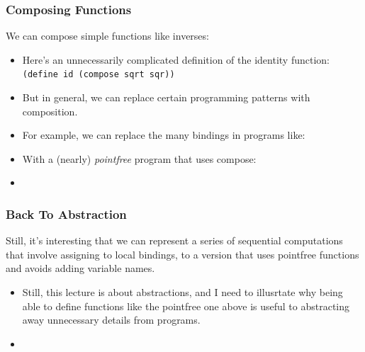 \documentclass{beamer}
\begin{document}





\begin{frame}
  \frametitle{Composing Functions}
  We can compose simple functions like inverses:
  \begin{itemize}
  \item<2-> Here's an unnecessarily complicated definition of the identity function: \texttt{(define id (compose sqrt sqr))}
  \item<3-> But in general, we can replace certain programming patterns with
    composition.
  \item<4-> For example, we can replace the many bindings in programs like:
    \bindings
  \item<5-> With a (nearly) \emph{pointfree} program that uses compose:
  \item<6-> \pointfree  
  \end{itemize}
\end{frame}

\begin{frame}
  \frametitle{Back To Abstraction}
  Still, it's interesting that we can represent a series of sequential
  computations that involve assigning to local bindings, to a version that
  uses pointfree functions and avoids adding variable names.
  \begin{itemize}
  \item<2-> Still, this lecture is about abstractions, and I need to illusrtate
    why being able to define functions like the pointfree one above is
    useful to abstracting away unnecessary details from programs.
  \item<3->
  \end{itemize}
\end{frame}
\end{document}
